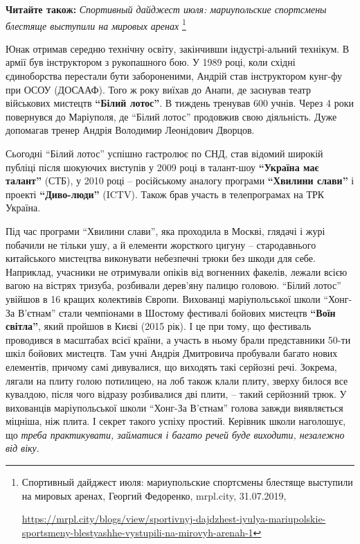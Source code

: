\textbf{Читайте також:} \emph{Спортивный дайджест июля: мариупольские спортсмены блестяще выступили на мировых аренах}%
\footnote{Спортивный дайджест июля: мариупольские спортсмены блестяще выступили на мировых аренах, %
Георгий Федоренко, mrpl.city, 31.07.2019, \par%
\url{https://mrpl.city/blogs/view/sportivnyj-dajdzhest-iyulya-mariupolskie-sportsmeny-blestyashhe-vystupili-na-mirovyh-arenah-1}
}

Юнак отримав середню технічну освіту, закінчивши індустрі\hyp{}альний технікум. В
армії був інструктором з рукопашного бою. У 1989 році, коли східні єдиноборства
перестали бути забороненими, Андрій став інструктором кунг-фу при ОСОУ
(ДОСААФ). Того ж року виїхав до Анапи, де заснував театр військових мистецтв
\textbf{\enquote{Білий лотос}}. В тиждень тренував 600 учнів. Через 4 роки повернувся до
Маріуполя, де \enquote{Білий лотос} продовжив свою діяльність. Дуже допомагав тренер
Андрія Володимир Леонідович Дворцов.


Сьогодні \enquote{Білий лотос} успішно гастролює по СНД, став відомий широкій публіці
після шокуючих виступів у 2009 році в талант-шоу \textbf{\enquote{Україна має талант}} (СТБ), у
2010 році – російському аналогу програми \textbf{\enquote{Хвилини слави}} і проекті \textbf{\enquote{Диво-люди}}
(ICTV). Також брав участь в телепрограмах на ТРК Україна.


Під час програми \enquote{Хвилини слави}, яка проходила в Москві, глядачі і журі
побачили не тільки ушу, а й елементи жорсткого цигуну – стародавнього
китайського мистецтва виконувати небезпечні трюки без шкоди для себе.
Наприклад, учасники не отримували опіків від вогненних факелів, лежали всією
вагою на вістрях тризуба, розбивали дерев'яну палицю головою. \enquote{Білий лотос}
увійшов в 16 кращих колективів Європи. Вихованці маріупольської школи \enquote{Хонг-За
В'єтнам} стали чемпіонами в Шостому фестивалі бойових мистецтв \textbf{\enquote{Воїн світла}},
який пройшов в Києві (2015 рік). І це при тому, що фестиваль проводився в
масштабах всієї країни, а участь в ньому брали представники 50-ти шкіл бойових
мистецтв. Там учні Андрія Дмитровича пробували багато нових елементів, причому
самі дивувалися, що виходять такі серйозні речі. Зокрема, лягали на плиту голою
потилицею, на лоб також клали плиту, зверху билося все кувалдою, після чого
відразу розбивалися дві плити, – такий серйозний трюк. У вихованців
маріупольської школи \enquote{Хонг-За В'єтнам} голова завжди виявляється міцніша, ніж
плита. І секрет такого успіху простий. Керівник школи наголошує, що \emph{треба
практикувати, займатися і багато речей буде виходити, незалежно від віку}.

